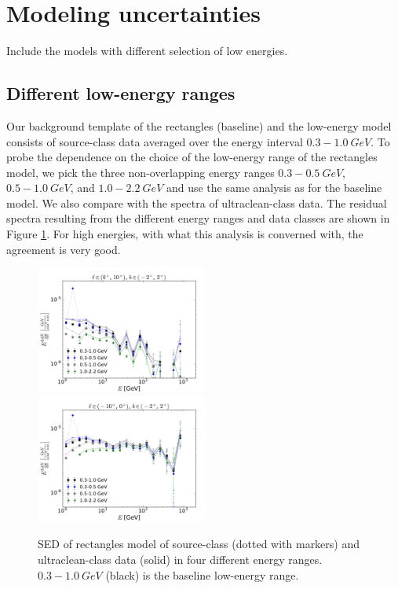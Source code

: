 \section{Modeling uncertainties}

Include the models with different selection of low energies.
\subsection{Different low-energy ranges}
Our background template of the rectangles (baseline) and the low-energy model consists of source-class data averaged over the energy interval $0.3 - \SI{1.0}{GeV}$. To probe the dependence on the choice of the low-energy range of the rectangles model, we pick the three non-overlapping energy ranges $0.3 - \SI{0.5}{GeV}$, $0.5 - \SI{1.0}{GeV}$, and $1.0 - \SI{2.2}{GeV}$ and use the same analysis as for the baseline model. We also compare with the spectra of ultraclean-class data. The residual spectra resulting from the different energy ranges and data classes are shown in Figure \ref{fig:syst_models}. For high energies, with what this analysis is converned with, the agreement is very good. 
\begin{figure}[h]
\includegraphics[width=0.5\textwidth]{plots/SED_different_lowE_ranges_boxes_l=5_b=0.pdf}
\includegraphics[width=0.5\textwidth]{plots/SED_different_lowE_ranges_boxes_l=-5_b=0.pdf}
  	\caption{SED of rectangles model of source-class (dotted with markers) and ultraclean-class data (solid) in four different energy ranges. $0.3 - \SI{1.0}{GeV}$ (black) is the baseline low-energy range.}
  	\label{fig:syst_models}
\end{figure}